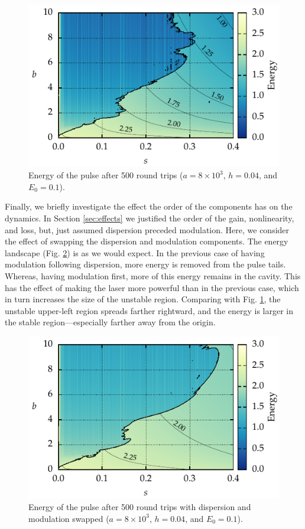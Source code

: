\documentclass[9pt,twocolumn,twoside]{osajnl}
\begin{document}
\begin{figure}[tbp]
	\centering
	\includegraphics{Figures/ParamSpaceEnergy}
	\caption{Energy of the pulse after 500 round trips ($a = 8 \times 10^3$, $h = 0.04$, and $E_0 = 0.1$).}
	\label{fig:energy}
\end{figure}

Finally, we briefly investigate the effect the order of the components has on the dynamics. In Section \ref{sec:effects} we justified the order of the gain, nonlinearity, and loss, but, just assumed dispersion preceded modulation. Here, we consider the effect of swapping the dispersion and modulation components. The energy landscape (Fig. \ref{fig:energyswitch}) is as we would expect. In the previous case of having modulation following dispersion, more energy is removed from the pulse tails. Whereas, having modulation first, more of this energy remains in the cavity. This has the effect of making the laser more powerful than in the previous case, which in turn increases the size of the unstable region. Comparing with Fig. \ref{fig:energy}, the unstable upper-left region spreads farther rightward, and the energy is larger in the stable region---especially farther away from the origin.

\begin{figure}[tbp]
	\centering
	\includegraphics{Figures/ParamSpaceEnergySwitch}
	\caption{Energy of the pulse after 500 round trips with dispersion and modulation swapped ($a = 8 \times 10^3$, $h = 0.04$, and $E_0 = 0.1$).}
	\label{fig:energyswitch}
\end{figure}
\end{document}
